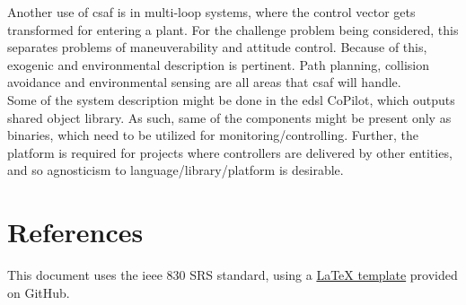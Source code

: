 Another use of \acrshort{csaf} is in multi-loop systems, where the control vector gets transformed for entering a plant. For the challenge problem being considered, this separates problems of maneuverability and attitude control. Because of this, exogenic and environmental description is pertinent. Path planning, collision avoidance and environmental sensing are all areas that \acrshort{csaf} will handle.\\

Some of the system description might be done in the \acrshort{edsl} CoPilot, which outputs shared object library. As such, same of the components might be present only as binaries, which need to be utilized for monitoring/controlling. Further, the platform is required for projects where controllers are delivered by other entities, and so agnosticism to language/library/platform is desirable. 

\section{References}

This document uses the \acrshort{ieee} 830 SRS standard, using a \href{https://github.com/jpeisenbarth/SRS-Tex}{\LaTeX{} template} provided on GitHub.  \\
